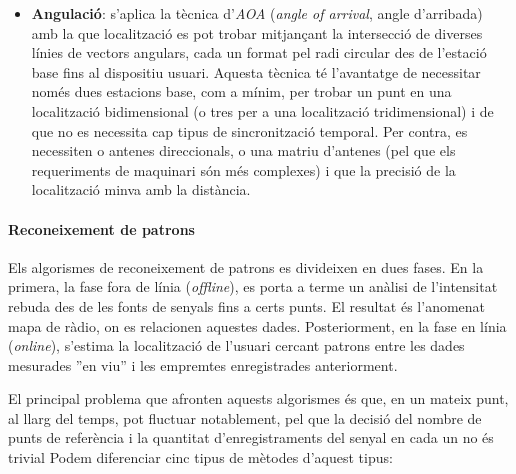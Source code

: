 \begin{itemize}
\begin{itemize}
    \end{itemize}

    \item \textbf{Angulació}: s’aplica la tècnica d’\textit{AOA} (\textit{angle of arrival}, angle d'arribada) amb la que localització es pot trobar mitjançant la intersecció de diverses línies de vectors angulars, cada un format pel radi circular des de l'estació base fins al dispositiu usuari. Aquesta tècnica té l'avantatge de necessitar només dues estacions base, com a mínim, per trobar un punt en una localització bidimensional (o tres per a una localització tridimensional) \cite{liu} i de que no es necessita cap tipus de sincronització temporal. Per contra, es necessiten o antenes direccionals, o una matriu d'antenes (pel que els requeriments de maquinari són més complexes) i que la precisió de la localització minva amb la distància.
    
\end{itemize}

\paragraph{Reconeixement de patrons}

Els algorismes de reconeixement de patrons es divideixen en dues fases. En la primera, la fase fora de línia (\textit{offline}), es porta a terme un anàlisi de l'intensitat rebuda des de les fonts de senyals fins a certs punts. El resultat és l’anomenat mapa de ràdio, on es relacionen aquestes dades. Posteriorment, en la fase en línia (\textit{online}), s'estima la localització de l'usuari cercant patrons entre les dades mesurades ''en viu'' i les empremtes enregistrades anteriorment.

El principal problema que afronten aquests algorismes és que, en un mateix punt, al llarg del temps, pot fluctuar notablement, pel que la decisió del nombre de punts de referència i la quantitat d'enregistraments del senyal en cada un no és trivial \cite{bagosi}
Podem diferenciar cinc tipus de mètodes d'aquest tipus:

